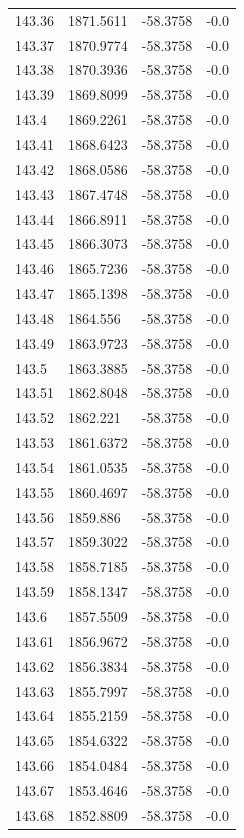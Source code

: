 \begin{table}[H]
\begin{tabular}{llll}
143.36 & 1871.5611 & -58.3758 & -0.0 \\
143.37 & 1870.9774 & -58.3758 & -0.0 \\
143.38 & 1870.3936 & -58.3758 & -0.0 \\
143.39 & 1869.8099 & -58.3758 & -0.0 \\
143.4 & 1869.2261 & -58.3758 & -0.0 \\
143.41 & 1868.6423 & -58.3758 & -0.0 \\
143.42 & 1868.0586 & -58.3758 & -0.0 \\
143.43 & 1867.4748 & -58.3758 & -0.0 \\
143.44 & 1866.8911 & -58.3758 & -0.0 \\
143.45 & 1866.3073 & -58.3758 & -0.0 \\
143.46 & 1865.7236 & -58.3758 & -0.0 \\
143.47 & 1865.1398 & -58.3758 & -0.0 \\
143.48 & 1864.556 & -58.3758 & -0.0 \\
143.49 & 1863.9723 & -58.3758 & -0.0 \\
143.5 & 1863.3885 & -58.3758 & -0.0 \\
143.51 & 1862.8048 & -58.3758 & -0.0 \\
143.52 & 1862.221 & -58.3758 & -0.0 \\
143.53 & 1861.6372 & -58.3758 & -0.0 \\
143.54 & 1861.0535 & -58.3758 & -0.0 \\
143.55 & 1860.4697 & -58.3758 & -0.0 \\
143.56 & 1859.886 & -58.3758 & -0.0 \\
143.57 & 1859.3022 & -58.3758 & -0.0 \\
143.58 & 1858.7185 & -58.3758 & -0.0 \\
143.59 & 1858.1347 & -58.3758 & -0.0 \\
143.6 & 1857.5509 & -58.3758 & -0.0 \\
143.61 & 1856.9672 & -58.3758 & -0.0 \\
143.62 & 1856.3834 & -58.3758 & -0.0 \\
143.63 & 1855.7997 & -58.3758 & -0.0 \\
143.64 & 1855.2159 & -58.3758 & -0.0 \\
143.65 & 1854.6322 & -58.3758 & -0.0 \\
143.66 & 1854.0484 & -58.3758 & -0.0 \\
143.67 & 1853.4646 & -58.3758 & -0.0 \\
143.68 & 1852.8809 & -58.3758 & -0.0 \\

\end{tabular}
\end{table}
